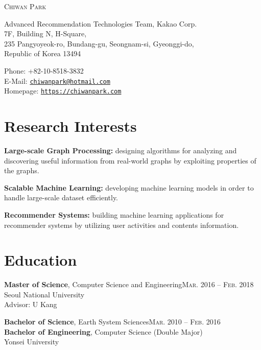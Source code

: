 \documentclass[11pt,a4paper]{article}
\makeatletter
\def\myname{Chiwan Park}
\def\myphone{+82-10-8518-3832}
\def\myaddress{Advanced Recommendation Technologies Team, Kakao Corp.\\
7F, Building N, H-Square,\\
235 Pangyoyeok-ro, Bundang-gu, Seongnam-si, Gyeonggi-do,\\
Republic of Korea 13494}
\def\myemail{chiwanpark@hotmail.com}
\def\myhomepage{https://chiwanpark.com}
\renewenvironment{itemize}{
  \begin{list}{}{
    \setlength{\leftmargin}{1.5em}
    \setlength{\itemsep}{0.5em}
    \setlength{\parskip}{0pt}
    \setlength{\parsep}{0.25em}
  }
}{
  \end{list}
}
\makeatother
\begin{document}
\par{\Huge \textsc{\myname}}

\bigskip

\begin{minipage}[t]{0.625\textwidth}
  \myaddress
\end{minipage}
\begin{minipage}[t]{0.375\textwidth}
  Phone: \myphone\\
  E-Mail: \href{mailto:\myemail}{\texttt{\myemail}}\\
  Homepage: \href{\myhomepage}{\texttt{\myhomepage}}
\end{minipage}

\section*{Research Interests}
\begin{itemize}
  \item \textbf{Large-scale Graph Processing:} designing algorithms for analyzing and discovering useful information from real-world graphs by exploiting properties of the graphs.
  \item \textbf{Scalable Machine Learning:} developing machine learning models in order to handle large-scale dataset efficiently.
  \item \textbf{Recommender Systems:} building machine learning applications for recommender systems by utilizing user activities and contents information.
\end{itemize}

\section*{Education}
\begin{itemize}
  \item \textbf{Master of Science}, Computer Science and Engineering\hfill\textsc{Mar. 2016 -- Feb. 2018}\\
        Seoul National University\\
        Advisor: U Kang
  \item \textbf{Bachelor of Science}, Earth System Sciences\hfill\textsc{Mar. 2010 -- Feb. 2016}\\
        \textbf{Bachelor of Engineering}, Computer Science (Double Major)\\
        Yonsei University
\end{itemize}

\end{document}
